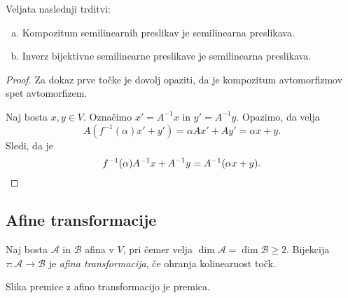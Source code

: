 \begin{trditev}
	Veljata naslednji trditvi:
	
    \begin{enumerate}[a)]
        \item Kompozitum semilinearnih preslikav je semilinearna preslikava.
        \item Inverz bijektivne semilinearne preslikave je semilinearna preslikava.
    \end{enumerate}
\end{trditev}

\begin{proof}
	Za dokaz prve točke je dovolj opaziti, da je kompozitum avtomorfizmov spet avtomorfizem.
	
	Naj bosta $x,y \in V$. Označimo $x' = A^{-1}x$ in $y' = A^{-1}y$. Opazimo, da velja
        \[
            A(f^{-1}(\alpha)x' + y') = \alpha Ax' + Ay' = \alpha x + y.
        \]
        Sledi, da je
        \[
            f^{-1}(\alpha)A^{-1}x + A^{-1}y = A^{-1}(\alpha x + y). \qedhere
        \]
\end{proof}

\newpage

\subsection{Afine transformacije}

\begin{definicija}
    Naj bosta $\mathcal{A}$ in $\mathcal{B}$ afina v $V$, pri čemer velja $\dim \mathcal{A} = \dim \mathcal{B} \geq 2$. Bijekcija $\tau \colon \mathcal{A} \to \mathcal{B}$ je \emph{afina transformacija}, če ohranja kolinearnost točk.
\end{definicija}

\begin{izrek}
    Slika premice z afino transformacijo je premica.
\end{izrek}

